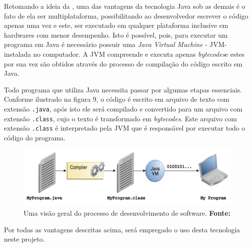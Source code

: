 \par Retomando a ideia da , uma das vantagens da tecnologia Java sob as demais é o fato de ela ser multiplataforma, possibilitando ao desenvolvedor escrever o código apenas uma vez e este, ser executado em qualquer plataforma inclusive em hardwares com menor desempenho. Isto é possível, pois, para executar um programa em Java é necessário possuir uma \textit{Java Virtual Machine} - JVM\footnotemark[12] - instalada no computador. A JVM compreende e executa apenas \textit{bytecodes}\footnotemark[13] e estes por sua vez são obtidos através do processo de compilação do código escrito em Java.



\par Todo programa que utiliza Java necessita passar por algumas etapas essenciais. Conforme ilustrado na figura 9, o código é escrito em arquivo de texto com extensão \texttt{.java}, após isto ele será compilado e convertido para um arquivo com extensão \texttt{.class}, cujo o texto é transformado em \textit{bytecodes}. Este arquivo com extensão \texttt{.class} é interpretado pela JVM que é responsável por executar todo o código do programa.

\begin{figure}[h!]
	\centerline{\includegraphics[scale=1]{./imagens/processo_compilacao_java.png}}
	\caption[Uma visão geral do processo de desenvolvimento de software.]
	{Uma visão geral do processo de desenvolvimento de software. \textbf{Fonte:} }
	\label{fig:exemplo1}
\end{figure}

\par Por todas as vantagens descritas acima, será empregado o uso desta tecnologia neste projeto.
